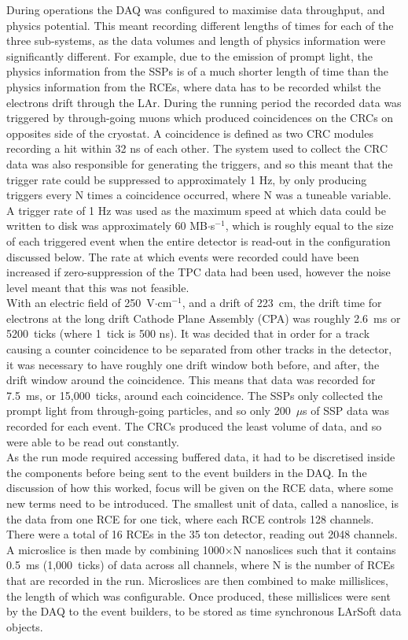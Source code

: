 During operations the DAQ was configured to maximise data throughput, and physics potential. This meant recording different lengths of times for each of the three sub-systems, as the data volumes and length of physics information were significantly different. For example, due to the emission of prompt light, the physics information from the SSPs is of a much shorter length of time than the physics information from the RCEs, where data has to be recorded whilst the electrons drift through the LAr. During the running period the recorded data was triggered by through-going muons which produced coincidences on the CRCs on opposites side of the cryostat. A coincidence is defined as two CRC modules recording a hit within 32 ns of each other. The system used to collect the CRC data was also responsible for generating the triggers, and so this meant that the trigger rate could be suppressed to approximately 1 Hz, by only producing triggers every N times a coincidence occurred, where N was a tuneable variable. A trigger rate of 1 Hz was used as the maximum speed at which data could be written to disk was approximately 60 MB$\cdot$s$^{-1}$, which is roughly equal to the size of each triggered event when the entire detector is read-out in the configuration discussed below. The rate at which events were recorded could have been increased if zero-suppression of the TPC data had been used, however the noise level meant that this was not feasible. \\ 

With an electric field of 250~V$\cdot$cm$^{-1}$, and a drift of 223~cm, the drift time for electrons at the long drift Cathode Plane Assembly (CPA) was roughly 2.6~ms or 5200~ticks (where 1~tick is 500 ns). It was decided that in order for a track causing a counter coincidence to be separated from other tracks in the detector, it was necessary to have roughly one drift window both before, and after, the drift window around the coincidence. This means that data was recorded for 7.5~ms, or 15,000~ticks, around each coincidence. The SSPs only collected the prompt light from through-going particles, and so only 200~$\mu$s of SSP data was recorded for each event. The CRCs produced the least volume of data, and so were able to be read out constantly. \\

As the run mode required accessing buffered data, it had to be discretised inside the components before being sent to the event builders in the DAQ. In the discussion of how this worked, focus will be given on the RCE data, where some new terms need to be introduced. The smallest unit of data, called a nanoslice, is the data from one RCE for one tick, where each RCE controls 128 channels. There were a total of 16 RCEs in the 35 ton detector, reading out 2048 channels. A microslice is then made by combining 1000$\times$N nanoslices such that it contains 0.5~ms (1,000~ticks) of data across all channels, where N is the number of RCEs that are recorded in the run. Microslices are then combined to make millislices, the length of which was configurable. Once produced, these millislices were sent by the DAQ to the event builders, to be stored as time synchronous LArSoft data objects. \\

